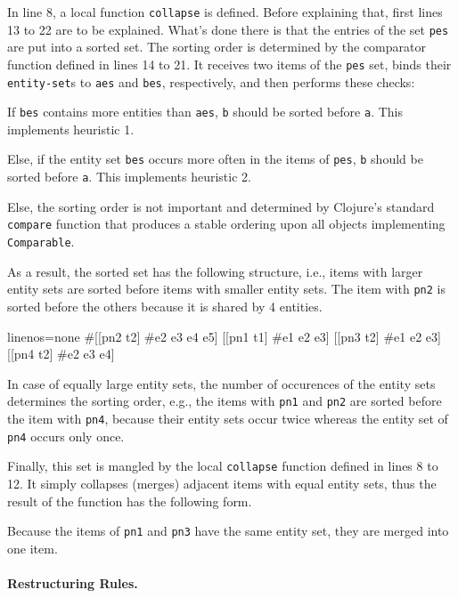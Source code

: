 \documentclass[submission]{eptcs}
\begin{document}
In line 8, a local function \verb|collapse| is defined.  Before explaining
that, first lines 13 to 22 are to be explained.  What's done there is that the
entries of the set \verb|pes| are put into a sorted set.  The sorting order is
determined by the comparator function defined in lines 14 to 21.  It receives
two items of the \verb|pes| set, binds their \verb|entity-set|s to \verb|aes|
and \verb|bes|, respectively, and then performs these checks:
\begin{compactenum}
\item If \verb|bes| contains more entities than \verb|aes|, \verb|b| should be
  sorted before \verb|a|.  This implements heuristic 1.
\item Else, if the entity set \verb|bes| occurs more often in the items of
  \verb|pes|, \verb|b| should be sorted before \verb|a|.  This implements
  heuristic 2.
\item Else, the sorting order is not important and determined by Clojure's
  standard \verb|compare| function that produces a stable ordering upon all
  objects implementing \verb|Comparable|.
\end{compactenum}
As a result, the sorted set has the following structure, i.e., items with
larger entity sets are sorted before items with smaller entity sets.  The item
with \verb|pn2| is sorted before the others because it is shared by 4 entities.
\begin{clojurecode*}{linenos=none}
#{[[pn2 t2] #{e2 e3 e4 e5}]  [[pn1 t1] #{e1 e2 e3}]
  [[pn3 t2] #{e1 e2 e3}]     [[pn4 t2] #{e2 e3 e4}]}
\end{clojurecode*}
In case of equally large entity sets, the number of occurences of
the entity sets determines the sorting order, e.g., the items with \verb|pn1|
and \verb|pn2| are sorted before the item with \verb|pn4|, because their entity
sets occur twice whereas the entity set of \verb|pn4| occurs only once.

Finally, this set is mangled by the local \verb|collapse| function defined in
lines 8 to 12.  It simply collapses (merges) adjacent items with equal entity
sets, thus the result of the function has the following form.
\begin{clojurecode*}{linenos=none}
([([pn2 t2]) #{e2 e3 e4 e5}],    [([pn1 t1] [pn3 t2]) #{e1 e2 e3}],    [([pn4 t2]) #{e2 e3 e4}]}
\end{clojurecode*}
Because the items of \verb|pn1| and \verb|pn3| have the same entity set, they
are merged into one item.


\paragraph{Restructuring Rules.}
\end{document}
